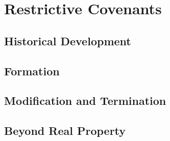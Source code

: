 \chapter{Restrictive Covenants}




\section{Historical Development}





\begin{questions}

\end{questions}



\section{Formation}





\begin{questions}

\end{questions}



\begin{questions}

\end{questions}

\section{Modification and Termination}







\begin{questions}

\end{questions}


\section{Beyond Real Property}



\endinput

